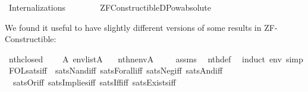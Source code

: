 %
\begin{isabellebody}%
%
%
\isadelimdocument
%
\endisadelimdocument
%
\isatagdocument
%
\isamarkuptrue%
%
\endisatagdocument
{\isafolddocument}%
%
\isadelimdocument
%
\endisadelimdocument
%
\isadelimtheory
%
\endisadelimtheory
%
\isatagtheory
{}\isamarkupfalse%
\ Internalizations\isanewline
\ \ \ \isanewline
\ \ \ \ {\isachardoublequoteopen}ZF{\isacharminus}{\kern0pt}Constructible{\isachardot}{\kern0pt}DPow{\isacharunderscore}{\kern0pt}absolute{\isachardoublequoteclose}\ \isanewline
{}%
\endisatagtheory
{\isafoldtheory}%
%
\isadelimtheory
%
\endisadelimtheory
%
\begin{isamarkuptext}%
We found it useful to have slightly different versions of some 
results in ZF-Constructible:%
\end{isamarkuptext}\isamarkuptrue%
\isamarkupfalse%
\ nth{\isacharunderscore}{\kern0pt}closed\ {\isacharcolon}{\kern0pt}\isanewline
\ \ \ {\isachardoublequoteopen}{}{\isasymin}A{\isachardoublequoteclose}\ {\isachardoublequoteopen}env{\isasymin}list{\isacharparenleft}{\kern0pt}A{\isacharparenright}{\kern0pt}{\isachardoublequoteclose}\isanewline
\ \ \ {\isachardoublequoteopen}nth{\isacharparenleft}{\kern0pt}n{\isacharcomma}{\kern0pt}env{\isacharparenright}{\kern0pt}{\isasymin}A{\isachardoublequoteclose}\ \isanewline
%
\isadelimproof
\ \ %
\endisadelimproof
%
\isatagproof
{}\isamarkupfalse%
\ assms{\isacharparenleft}{\kern0pt}{}{\isacharcomma}{\kern0pt}{}{\isacharparenright}{\kern0pt}\ \isamarkupfalse%
\ nth{\isacharunderscore}{\kern0pt}def\ \isamarkupfalse%
\ {\isacharparenleft}{\kern0pt}induct\ env{\isacharsemicolon}{\kern0pt}\ simp{\isacharparenright}{\kern0pt}%
\endisatagproof
{\isafoldproof}%
%
\isadelimproof
\isanewline
%
\endisadelimproof
\isanewline
{}\isamarkupfalse%
\ FOL{\isacharunderscore}{\kern0pt}sats{\isacharunderscore}{\kern0pt}iff\ {\isacharequal}{\kern0pt}\ sats{\isacharunderscore}{\kern0pt}Nand{\isacharunderscore}{\kern0pt}iff\ sats{\isacharunderscore}{\kern0pt}Forall{\isacharunderscore}{\kern0pt}iff\ sats{\isacharunderscore}{\kern0pt}Neg{\isacharunderscore}{\kern0pt}iff\ sats{\isacharunderscore}{\kern0pt}And{\isacharunderscore}{\kern0pt}iff\isanewline
\ \ sats{\isacharunderscore}{\kern0pt}Or{\isacharunderscore}{\kern0pt}iff\ sats{\isacharunderscore}{\kern0pt}Implies{\isacharunderscore}{\kern0pt}iff\ sats{\isacharunderscore}{\kern0pt}Iff{\isacharunderscore}{\kern0pt}iff\ sats{\isacharunderscore}{\kern0pt}Exists{\isacharunderscore}{\kern0pt}iff\ \isanewline

\end{isabellebody}
